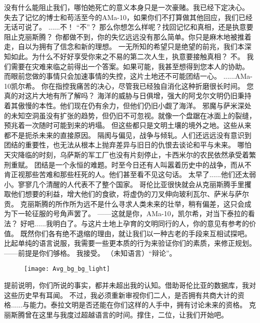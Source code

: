\documentclass[openany]{book}
\begin{document}
\begin{dialogue}
     没有什么能阻止我们，哪怕她死亡的意义本身只是一次豪赌。我已经下定决心。
     失去了记忆的博士和苟活至今的AMa-10，如果你们不打算做其他回应，我们已经无话可说了。
     ......不！
     “不”？
     那么你想怎么样呢？找回记忆和真相，还是执意要阻止克丽斯腾？
     你都做不到，你的失忆远远没有那么简单。你只是麻木地被推着走，自以为拥有了信念和新的理想。
     一无所知的希望只是绝望的前兆，我们本深知如此。为什么不好好享受你来之不易的第二次人生，执意要接触真相？
     不。
     我们需要在灾难来临之前得出一个答案。如果可能，我甚至想得到您本人的协助。
     而眼前您做的事情只会加速事情的失控，这片土地还不可能团结一心。
     ......AMa-10凯尔希。
     你在指控我痛苦的决心，尽管我已经独自消化这种折磨很长时间。
     您真的对这片大地有所了解吗？
     海洋的威胁与日俱增，强大的阿戈尔文明仍旧秉持着其傲慢的本性。他们现在仍有余力，但他们仍旧小觑了海洋。
     邪魔与萨米深处的未知空洞虽没有扩张的趋势，但仍旧不可忽视。就像一个盘踞在冰面上的裂缝，预兆着一次随时可能到来的坍塌。
     但这些都只是文明土壤的境外之地。这些从来都不是扼杀未来的直接原因。
     隔阂与偏见，战争与倾轧。人们还远远没有意识到团结的重要性，也无法从根本上抛弃差异与旧日的仇恨去谈论和平与未来。
     哪怕天灾降临的时刻，乌萨斯的军工厂也没有片刻停止，卡西米尔的农民依然承受着繁刑重赋。
     团结是一个永恒的难题。时至今日还有人叫嚣着历史中的战争，而从不肯正视那些苦难和那些枉死的人。他们甚至看不见这句话。
     太早了......他们还太弱小。寥寥几个清醒的人代表不了整个国家。
     哥伦比亚很快就会从克丽斯腾手里攫取他们想要的利益，增大他们的食欲，将虚伪的刀叉伸向玻利瓦尔、萨米与萨尔贡。
     克丽斯腾的所作所为远不是什么寻求人类未来的壮举，稍有偏差，这只会成为下一轮征服的号角声罢了。
     ——这就是你，AMa-10，凯尔希，对当下泰拉的看法？
     好吧......我明白了。与这片土地上孕育的文明同行的人，你的意见有参考的价值。
     既然你们各有绝不退缩的理由，就让我们以一种古老的手段来互相试探吧。
     比起单纯的语言说服，我需要一些更本质的行为来验证你们的素质，来修正规划。
     ——前提是你们够格。
     我接受。
     （未知语言）“辩论”。
    \begin{figure}[h]
        \centering
        \texttt{[image: Avg\_bg\_bg\_light]}
    \end{figure}
     提前说明，你们所说的事实，都并未超出我的认知。借助哥伦比亚的数据库，我对这些历史早有耳闻。
     不过，我必须重新审视你们二人，是否拥有共商大计的资格......与能力。泰拉文明是否还能在你们这样的人手中，拥有讨论未来的资格。
     克丽斯腾曾在这里与我度过超越语言的时间。撑住，二位，让我们开始吧。
\end{dialogue}
\end{document}
